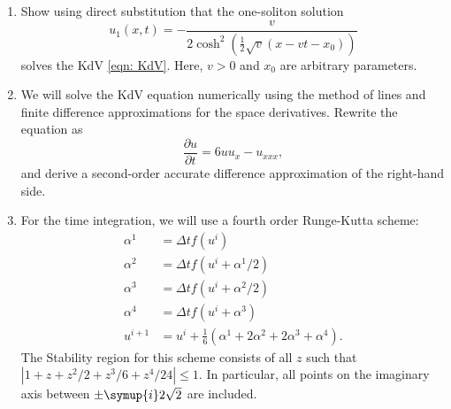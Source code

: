 \documentclass{assignment}[2019/10/15]
\newcommand{\mi}{\symup{i}}
\begin{document}
    \begin{enumerate}[1)]
        \item Show using direct substitution that the one-soliton solution
        \begin{equation}\label{eqn: one-s}
            u_1(x, t) = -\frac{v}{2\cosh^2\left(\frac{1}{2}\sqrt{v}(x-vt-x_0)\right)}
        \end{equation}
        solves the KdV \ref{eqn: KdV}. Here, $v>0$ and $x_0$ are arbitrary parameters.
        \item We will solve the KdV equation numerically using the method of lines and finite difference approximations for the space derivatives. Rewrite the equation as
        \begin{equation}\label{eqn: KdVm}
            \frac{\partial u}{\partial t} = 6 uu_x - u_{xxx},
        \end{equation}
        and derive a second-order accurate difference approximation of the right-hand side.
        \item For the time integration, we will use a fourth order Runge-Kutta scheme:
        \begin{equation}
            \begin{aligned}
                \alpha^1 &= \Delta tf(u^i)\\
                \alpha^2 &= \Delta tf(u^i+\alpha^1/2)\\
                \alpha^3 &= \Delta tf(u^i+\alpha^2/2)\\
                \alpha^4 &= \Delta tf(u^i+\alpha^3)\\
                u^{i+1} &= u^i + \frac{1}{6}(\alpha^1+2\alpha^2+2\alpha^3+\alpha^4).
            \end{aligned}
        \end{equation}
        The Stability region for this scheme consists of all $z$ such that $\left\vert 1+z+z^2/2+z^3/6+z^4/24\right\vert\leq 1$. In particular, all points on the imaginary axis between $\pm \mi 2\sqrt{2}$ are included.


\end{enumerate}
\end{document}

